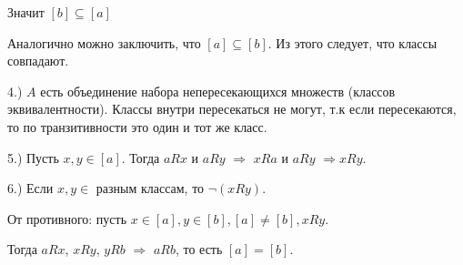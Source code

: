 Значит $[b] \subseteq [a]$

Аналогично можно заключить, что $[a] \subseteq [b]$. Из этого следует, что классы совпадают.

4.) $A$ есть объединение набора непересекающихся множеств (классов эквивалентности). Классы внутри пересекаться не могут, т.к если пересекаются, то по транзитивности это один и тот же класс.

5.) Пусть $x, y \in [a]$. Тогда $aRx$ и $aRy$ $\Rightarrow$ $xRa$ и $aRy$ $\Rightarrow xRy$.

6.) Если $x, y \in$ разным классам, то $\neg(xRy)$.

От противного: пусть $x \in [a], y \in [b], [a] \neq [b], xRy$.

Тогда $aRx$, $xRy$, $yRb$ $\Rightarrow$ $aRb$, то есть $[a] = [b]$.
